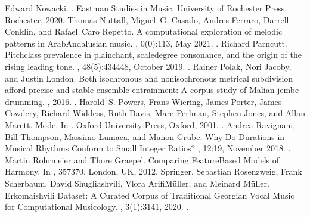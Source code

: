 \documentclass[letterpaper,10pt,english]{sphinxmanual}
\begin{document}
\begin{sphinxthebibliography}{10}
\sphinxAtStartPar
Edward Nowacki. . Eastman Studies in Music. University of Rochester Press, Rochester, 2020.
\sphinxAtStartPar
Thomas Nuttall, Miguel G. Casado, Andres Ferraro, Darrell Conklin, and Rafael Caro Repetto. A computational exploration of melodic patterns in Arab\sphinxhyphen{}Andalusian music. , 0(0):1\textendash{}13, May 2021. .
\sphinxAtStartPar
Richard Parncutt. Pitch\sphinxhyphen{}class prevalence in plainchant, scale\sphinxhyphen{}degree consonance, and the origin of the rising leading tone. , 48(5):434\textendash{}448, October 2019. .
\sphinxAtStartPar
Rainer Polak, Nori Jacoby, and Justin London. Both isochronous and non\sphinxhyphen{}isochronous metrical subdivision afford precise and stable ensemble entrainment: A corpus study of Malian jembe drumming. , 2016. .
\sphinxAtStartPar
Harold S. Powers, Frans Wiering, James Porter, James Cowdery, Richard Widdess, Ruth Davis, Marc Perlman, Stephen Jones, and Allan Marett. Mode. In . Oxford University Press, Oxford, 2001. .
\sphinxAtStartPar
Andrea Ravignani, Bill Thompson, Massimo Lumaca, and Manon Grube. Why Do Durations in Musical Rhythms Conform to Small Integer Ratios? , 12:1\textendash{}9, November 2018. .
\sphinxAtStartPar
Martin Rohrmeier and Thore Graepel. Comparing Feature\sphinxhyphen{}Based Models of Harmony. In , 357\textendash{}370. London, UK, 2012. Springer.
\sphinxAtStartPar
Sebastian Rosenzweig, Frank Scherbaum, David Shugliashvili, Vlora Arifi\sphinxhyphen{}Müller, and Meinard Müller. Erkomaishvili Dataset: A Curated Corpus of Traditional Georgian Vocal Music for Computational Musicology. , 3(1):31\textendash{}41, 2020. .

\end{sphinxthebibliography}
\end{document}
